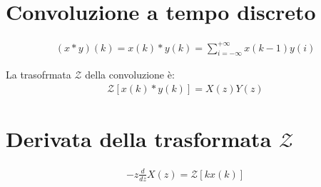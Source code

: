 \section{Convoluzione a tempo discreto}
\begin{align}
  (x * y)(k) = x(k) * y(k) = \sum_{i=-\infty}^{+\infty} x(k-1)y(i)
\end{align}

La trasofrmata $\mathcal{Z}$ della convoluzione \`e:
\begin{align}
  \mathcal{Z}[x(k) * y(k)] = X(z)Y(z)
\end{align}

\section{Derivata della trasformata $\mathcal{Z}$}

\begin{align}
  -z \frac{d}{dz} X(z) = \mathcal{Z}[k x(k)]
\end{align}
